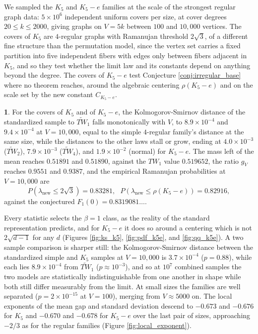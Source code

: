 \documentclass[12pt,oneside,english]{amsart}
\numberwithin{equation}{section}
\numberwithin{figure}{section}
\numberwithin{table}{section}
\theoremstyle{plain}
\numberwithin{thm}{section}
\theoremstyle{plain}
\theoremstyle{plain}
\theoremstyle{plain}
\theoremstyle{definition}
\theoremstyle{definition}
\newtheorem{numresult}[thm]{\protect\numresultname}
\theoremstyle{definition}
\theoremstyle{remark}
\providecommand{\numresultname}{Numerical Result}
\begin{document}
We sampled the $K_{5}$ and $K_{5}-e$ families at the scale of the
strongest regular graph data: $5\times10^{6}$ independent uniform
covers per size, at cover degrees $20\leq k\leq2000$, giving graphs
on $V=5k$ between $100$ and $10{,}000$ vertices. The covers of $K_{5}$
are $4$-regular graphs with Ramanujan threshold $2\sqrt{3}$, of
a different fine structure than the permutation model, since the vertex
set carries a fixed partition into five independent fibers with edges
only between fibers adjacent in $K_{5}$, and so they test whether
the limit law and its constants depend on anything beyond the degree.
The covers of $K_{5}-e$ test Conjecture \ref{conj:irregular_base}
where no theorem reaches, around the algebraic centering $\rho(K_{5}-e)$
and on the scale set by the new constant $C_{K_{5}-e}$.
\begin{numresult}
\label{nr:fixed_bulk}For the covers of $K_{5}$ and of $K_{5}-e$,
the Kolmogorov-Smirnov distance of the standardized sample to $\widetilde{TW}_{1}$
falls monotonically with $V$, to $8.9\times10^{-4}$ and $9.4\times10^{-4}$
at $V=10{,}000$, equal to the simple $4$-regular family's distance
at the same size, while the distances to the other laws stall or grow,
ending at $4.0\times10^{-3}$ ($\widetilde{TW}_{2}$), $7.9\times10^{-3}$
($\widetilde{TW}_{4}$), and $1.9\times10^{-2}$ (normal) for $K_{5}-e$.
The mass left of the mean reaches $0.51891$ and $0.51890$, against
the $TW_{1}$ value $0.519652$, the ratio $g_{V}$ reaches $0.9551$
and $0.9387$, and the empirical Ramanujan probabilities at $V=10{,}000$
are
\[
P\left(\lambda_{\mathrm{new}}\leq2\sqrt{3}\right)=0.83281,\ \ \ P\left(\lambda_{\mathrm{new}}\leq\rho(K_{5}-e)\right)=0.82916,
\]
against the conjectured $F_{1}(0)=0.8319081\dots$.
\end{numresult}
Every statistic selects the $\beta=1$ class, as the reality of the
standard representation predicts, and for $K_{5}-e$ it does so around
a centering which is not $2\sqrt{d-1}$ for any $d$ (Figures \ref{fig:ks_k5},
\ref{fig:pdf_k5e}, and \ref{fig:qq_k5e}). A two sample comparison
is sharper still: the Kolmogorov-Smirnov distance between the standardized
simple and $K_{5}$ samples at $V=10{,}000$ is $3.7\times10^{-4}$
($p=0.88$), while each lies $8.9\times10^{-4}$ from $\widetilde{TW}_{1}$
($p\approx10^{-3}$), and so at $10^{7}$ combined samples the two
models are statistically indistinguishable from one another in shape
while both still differ measurably from the limit. At small sizes
the families are well separated ($p=2\times10^{-15}$ at $V=100$),
merging from $V\approx5000$ on. The local exponents of the mean gap
and standard deviation descend to $-0.673$ and $-0.676$ for $K_{5}$
and $-0.670$ and $-0.678$ for $K_{5}-e$ over the last pair of sizes,
approaching $-2/3$ as for the regular families (Figure \ref{fig:local_exponent}).
\end{document}
